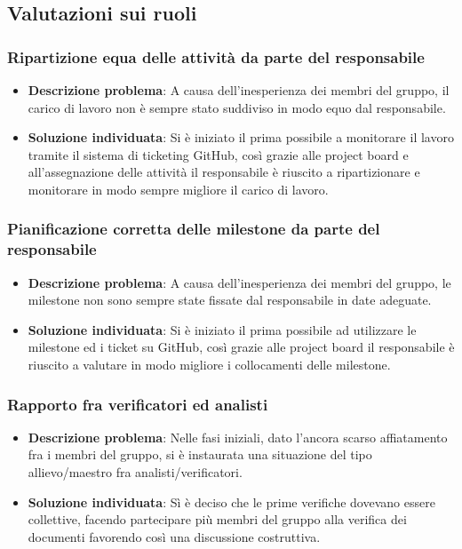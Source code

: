 \subsection{Valutazioni sui ruoli}
	\subsubsection{Ripartizione equa delle attività da parte del responsabile}
	\begin{itemize}
		\item \textbf{Descrizione problema}: A causa dell'inesperienza dei membri del gruppo, il carico di lavoro non è sempre stato suddiviso in modo equo dal responsabile.
		\item \textbf{Soluzione individuata}: Si è iniziato il prima possibile a monitorare il lavoro tramite il sistema di ticketing GitHub, così grazie alle project board e all'assegnazione delle attività il responsabile è riuscito a ripartizionare e monitorare in modo sempre migliore il carico di lavoro.
	\end{itemize}
	\subsubsection{Pianificazione corretta delle milestone da parte del responsabile}
	\begin{itemize}
	\item \textbf{Descrizione problema}: A causa dell'inesperienza dei membri del gruppo, le milestone non sono sempre state fissate dal responsabile in date adeguate.
	\item \textbf{Soluzione individuata}: Si è iniziato il prima possibile ad utilizzare le milestone ed i ticket su GitHub, così grazie alle project board il responsabile è riuscito a valutare in modo migliore i collocamenti delle milestone.
	\end{itemize}
	\subsubsection{Rapporto fra verificatori ed analisti}
		\begin{itemize}
			\item \textbf{Descrizione problema}: Nelle fasi iniziali, dato l'ancora scarso affiatamento fra i membri del gruppo, si è instaurata una situazione del tipo allievo/maestro fra analisti/verificatori.
			\item \textbf{Soluzione individuata}: Sì è deciso che le prime verifiche dovevano essere collettive, facendo partecipare più membri del gruppo alla verifica dei documenti favorendo così una discussione costruttiva.
		\end{itemize}
